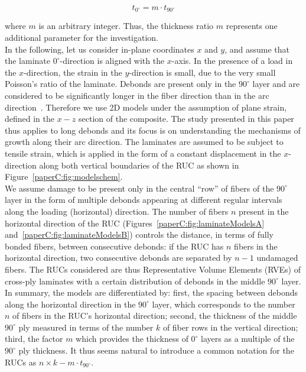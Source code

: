 \begin{equation}\label{paperC:eq:t90}
t_{0^{\circ}}=m\cdot t_{90^{\circ}}
\end{equation}

where $m$ is an arbitrary integer. Thus, the thickness ratio $m$ represents one additional parameter for the investigation.\\
In the following, let us consider in-plane coordinates $x$ and $y$, and assume that the laminate $0^{\circ}$-direction is aligned with the $x$-axis. In the presence of a load in the $x$-direction, the strain in the $y$-direction is small, due to the very small Poisson's ratio of the laminate. Debonds are present only in the $90^{\circ}$ layer and are considered to be significantly longer in the fiber direction than in the arc direction~\cite{Zhang1997}. Therefore we use 2D models under the assumption of plane strain, defined in the $x-z$ section of the composite. The study presented in this paper thus applies to long debonds and its focus is on understanding the mechanisms of growth along their arc direction. The laminates are assumed to be subject to tensile strain, which is applied in the form of a constant displacement in the $x$-direction along both vertical boundaries of the RUC as shown in  Figure~\ref{paperC:fig:modelschem}.\\
We assume damage to be present only in the central ``row'' of fibers of the $90^{\circ}$ layer in the form of multiple debonds appearing at different regular intervals along the loading (horizontal) direction. The number of fibers $n$ present in the horizontal direction of the RUC (Figures~\ref{paperC:fig:laminateModelsA} and~\ref{paperC:fig:laminateModelsB}) controls the distance, in terms of fully bonded fibers, between consecutive debonds: if the RUC has $n$ fibers in the horizontal direction, two consecutive debonds are separated by $n-1$ undamaged fibers. The RUCs considered are thus Representative Volume Elements (RVEs) of cross-ply laminates with a certain distribution of debonds in the middle $90^{\circ}$ layer.\\
In summary, the models are differentiated by: first, the spacing between debonds along the horizontal direction in the $90^{\circ}$ layer, which corresponds to the number $n$ of fibers in the RUC's horizontal direction; second, the thickness of the middle $90^{\circ}$ ply measured in terms of the number $k$ of fiber rows in the vertical direction; third, the factor $m$ which provides the thickness of $0^{\circ}$ layers as a multiple of the $90^{\circ}$ ply thickness. It thus seems natural to introduce a common notation for the RUCs as $n\times k-m\cdot t_{90^{\circ}}$.\\
